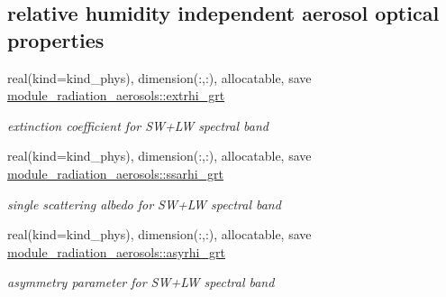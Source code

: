 \subsection*{relative humidity independent aerosol optical properties}
\begin{DoxyCompactItemize}
\item 
\mbox{\label{group__module__radiation__aerosols_gacb7ff037be78e950ea42d956816c93d5}} 
real(kind=kind\+\_\+phys), dimension(\+:,\+:), allocatable, save \hyperlink{group__module__radiation__aerosols_gacb7ff037be78e950ea42d956816c93d5}{module\+\_\+radiation\+\_\+aerosols\+::extrhi\+\_\+grt}
\begin{DoxyCompactList}\small\item\em extinction coefficient for S\+W+\+LW spectral band \end{DoxyCompactList}\item 
\mbox{\label{group__module__radiation__aerosols_gae8587d9b4ebd9cf5d363a82d15049324}} 
real(kind=kind\+\_\+phys), dimension(\+:,\+:), allocatable, save \hyperlink{group__module__radiation__aerosols_gae8587d9b4ebd9cf5d363a82d15049324}{module\+\_\+radiation\+\_\+aerosols\+::ssarhi\+\_\+grt}
\begin{DoxyCompactList}\small\item\em single scattering albedo for S\+W+\+LW spectral band \end{DoxyCompactList}\item 
\mbox{\label{group__module__radiation__aerosols_ga4b5f80817af9f2116618d6c8f0e194de}} 
real(kind=kind\+\_\+phys), dimension(\+:,\+:), allocatable, save \hyperlink{group__module__radiation__aerosols_ga4b5f80817af9f2116618d6c8f0e194de}{module\+\_\+radiation\+\_\+aerosols\+::asyrhi\+\_\+grt}
\begin{DoxyCompactList}\small\item\em asymmetry parameter for S\+W+\+LW spectral band \end{DoxyCompactList}\end{DoxyCompactItemize}
